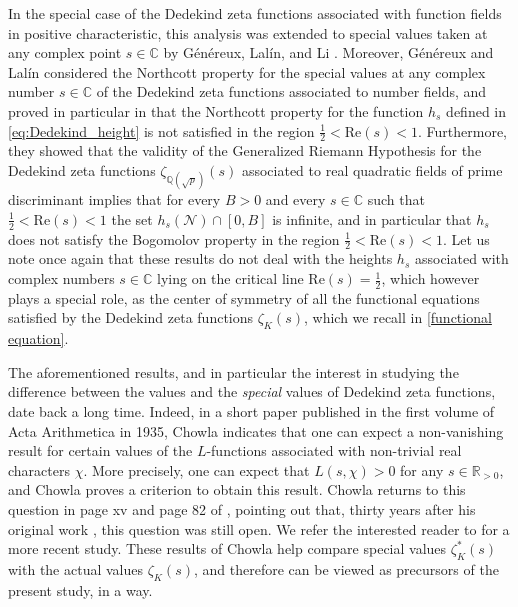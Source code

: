 \documentclass[10pt,a4paper]{amsart}
\theoremstyle{plain}
\theoremstyle{definition}
\theoremstyle{remark}
\begin{document}
In the special case of the Dedekind zeta functions associated with function fields in positive characteristic, this analysis was extended to special values taken at any complex point $s \in \mathbb{C}$ by Généreux, Lalín, and Li \cite{GeLaLi22}. Moreover, G\'en\'ereux and Lalín \cite{GeLa24} considered the Northcott property for the special values at any complex number $s \in \mathbb{C}$ of the Dedekind zeta functions associated to number fields, and proved in particular in \cite[Theorem~1.6]{GeLa24} that the Northcott property for the function $h_s$ defined in \eqref{eq:Dedekind_height} is not satisfied in the region $\frac{1}{2}<\mathrm{Re}(s)<1$. Furthermore, they showed that the validity of the Generalized Riemann Hypothesis for the Dedekind zeta functions $\zeta_{\mathbb{Q}(\sqrt{p})}(s)$ associated to real quadratic fields of prime discriminant implies that for every $B > 0$ and every $s \in \mathbb{C}$ such that $\frac{1}{2} < \mathrm{Re}(s) < 1$ the set $h_s(\mathcal{N}) \cap [0,B]$ is infinite, and in particular that $h_s$ does not satisfy the Bogomolov property in the region $\frac{1}{2} < \mathrm{Re}(s) < 1$. Let us note once again that these results do not deal with the heights $h_s$ associated with complex numbers $s \in \mathbb{C}$ lying on the critical line $\mathrm{Re}(s)=\frac{1}{2}$, which however plays a special role, as the center of symmetry of all the functional equations satisfied by the Dedekind zeta functions $\zeta_K(s)$, which we recall in \eqref{functional equation}. 

The aforementioned results, and in particular the interest in studying the difference between the values and the \textit{special} values of Dedekind zeta functions, date back a long time. Indeed, in a short paper published in the first volume of Acta Arithmetica in 1935, Chowla \cite{Cho35} indicates that one can expect a non-vanishing result for certain values of the $L$-functions associated with non-trivial real characters $\chi$. More precisely, one can expect that $L(s,\chi)>0$ for any $s \in \mathbb{R}_{> 0}$, and Chowla proves a criterion to obtain this result. Chowla returns to this question in page xv and page 82 of \cite{Cho65}, pointing out that, thirty years after his original work \cite{Cho35}, this question was still open. We refer the interested reader to \cite{Lou23} for a more recent study. These results of Chowla help compare special values $\zeta_K^\ast(s)$ with the actual values $\zeta_K(s)$, and therefore can be viewed as precursors of the present study, in a way.
\end{document}
